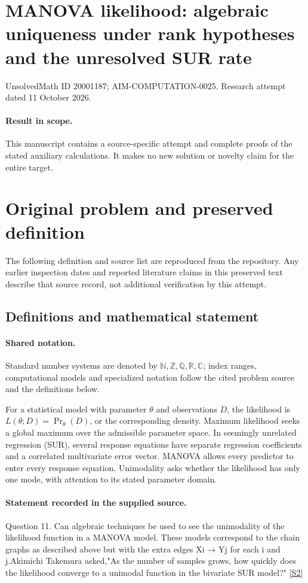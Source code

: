 \documentclass[11pt]{article}
\begin{document}
\section*{MANOVA likelihood: algebraic uniqueness under rank hypotheses and the unresolved SUR rate}
\noindent UnsolvedMath ID 20001187; AIM-COMPUTATION-0025. Research attempt dated 11 October 2026.
\paragraph{Result in scope.}This manuscript contains a source-specific attempt and complete proofs of the stated auxiliary calculations. It makes no new solution or novelty claim for the entire target.
\section{Original problem and preserved definition}
The following definition and source list are reproduced from the repository. Any earlier inspection dates and reported literature claims in this preserved text describe that source record, not additional verification by this attempt.
\subsection{Definitions and mathematical statement}

\paragraph{Shared notation.}Standard number systems are denoted by $\mathbb N,\mathbb Z,\mathbb Q,\mathbb R,\mathbb C$; index ranges, computational models and specialized notation follow the cited problem source and the definitions below.


For a statistical model with parameter $\theta$ and observations $D$, the likelihood is $L(\theta;D)=\Pr_\theta(D)$, or the corresponding density. Maximum likelihood seeks a global maximum over the admissible parameter space. In seemingly unrelated regression (SUR), several response equations have separate regression coefficients and a correlated multivariate error vector. MANOVA allows every predictor to enter every response equation. Unimodality asks whether the likelihood has only one mode, with attention to its stated parameter domain.
\paragraph{Statement recorded in the supplied source.}
Question 11. Can algebraic techniques be used to see the unimodality of the likelihood function in a MANOVA model. These models correspond to the chain graphs as described above but with the extra edges Xi → Yj for each i and j.Akimichi Takemura asked,"As the number of samples grows, how quickly does the likelihood converge to a unimodal function in the bivariate SUR model?" \href{https://aimath.org/WWN/compalgstat/compalgstat.pdf}{[S2]}
\end{document}
